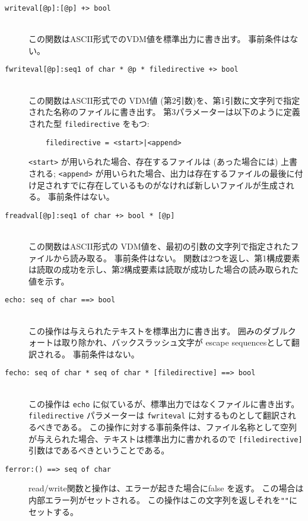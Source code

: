 \documentclass[\pformat,12pt]{jarticle}
\begin{document}
\begin{description}
\item[\texttt{writeval[@p]:[@p] +> bool}] \mbox{}\\
  この関数はASCII形式でのVDM値を標準出力に書き出す。
 事前条件はない。
\item[\texttt{fwriteval[@p]:seq1 of char * @p * filedirective +>
    bool}] \mbox{}\\
 この関数はASCII形式での VDM値 (第2引数)を、第1引数に文字列で指定された名称のファイルに書き出す。 
第3パラメーターは以下のように定義された型 \texttt{filedirective} をもつ:
  \begin{verbatim}
    filedirective = <start>|<append> 
  \end{verbatim}
  \texttt{<start>} が用いられた場合、存在するファイルは (あった場合には) 上書される; \texttt{<append>} が用いられた場合、出力は存在するファイルの最後に付け足されすでに存在しているものがなければ新しいファイルが生成される。 
事前条件はない。
\item[\texttt{freadval[@p]:seq1 of char +> bool * [@p]}] \mbox{}\\
この関数はASCII形式の VDM値を、最初の引数の文字列で指定されたファイルから読み取る。
事前条件はない。
関数は2つを返し、第1構成要素は読取の成功を示し、第2構成要素は読取が成功した場合の読み取られた値を示す。
\item[\texttt{echo: seq of char ==> bool}] \mbox{}\\
  この操作は与えられたテキストを標準出力に書き出す。
囲みのダブルクォートは取り除かれ、バックスラッシュ文字が \hypertarget{rule:escape sequence}{escape sequences}として翻訳される。
事前条件はない。
\item[\texttt{fecho: seq of char * seq of char * [filedirective] ==> bool}]
  \mbox{}\\
 この操作は \texttt{echo} に似ているが、標準出力ではなくファイルに書き出す。 
 \texttt{filedirective} パラメーターは \texttt{fwriteval} に対するものとして翻訳されるべきである。 
この操作に対する事前条件は、ファイル名称として空列が与えられた場合、テキストは標準出力に書かれるので \texttt{[filedirective]}引数はであるべきということである。 
\item[\texttt{ferror:()  ==> seq of char}]
  read/write関数と操作は、エラーが起きた場合にfalse を返す。
この場合は内部エラー列がセットされる。 
この操作はこの文字列を返しそれを\texttt{""}にセットする。
\end{description}
\end{document}
